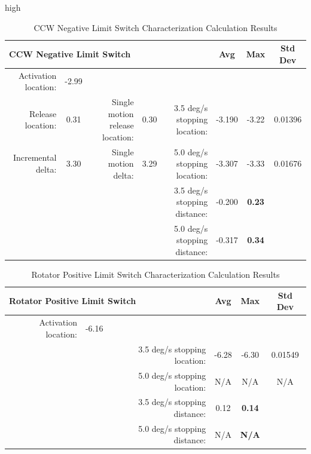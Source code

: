 high\documentclass[SE,lsstdraft,authoryear,toc]{lsstdoc}
\begin{document}
\begin{landscape}
\begin{table}[h!]
  \begin{center}
    \caption{CCW Negative Limit Switch Characterization Calculation Results}
    \label{tab:table2}
    \begin{tabular}{r|c|r|c|r|c|c|c}
    \multicolumn{5}{l|}{\textbf{CCW Negative Limit Switch}} & Avg & Max & Std Dev\\
    \midrule
    Activation location: & -2.99 & & & & & & \\
    Release location: & 0.31 & Single motion release location: & 0.30 & 3.5
    deg/s stopping location: & -3.190 & -3.22 & 0.01396 \\
    Incremental delta: & 3.30 & Single motion delta: & 3.29 & 5.0 deg/s
    stopping location: & -3.307 & -3.33 & 0.01676 \\
    & & & & 3.5 deg/s stopping distance: & -0.200 & \textbf{ 0.23} & \\
    & & & & 5.0 deg/s stopping distance: & -0.317 & \textbf{ 0.34} & \\
    \end{tabular}
  \end{center}
\end{table}

\begin{table}[h!]
  \begin{center}
    \caption{Rotator Positive Limit Switch Characterization Calculation Results}
    \label{tab:table3}
    \begin{tabular}{r|c|r|c|c|c}
    \multicolumn{3}{l|}{\textbf{Rotator Positive Limit Switch}} & Avg & Max & Std Dev\\
    \midrule
    Activation location: & -6.16 & & & & \\
    & & 3.5 deg/s stopping location: & -6.28 & -6.30 & 0.01549 \\
    & & 5.0 deg/s stopping location: & N/A & N/A & N/A \\
    & & 3.5 deg/s stopping distance: &  0.12 & \textbf{ 0.14} & \\
    & & 5.0 deg/s stopping distance: & N/A & \textbf{N/A} & \\
    \end{tabular}
  \end{center}
\end{table}


\end{landscape}
\end{document}
